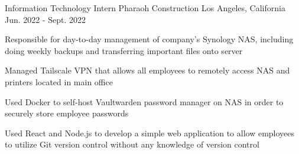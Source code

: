 \begin{cventries}
  \cventry
    {Information Technology Intern} %
    {Pharaoh Construction} %
    {Los Angeles, California} %
    {Jun. 2022 - Sept. 2022} %
    {
      \begin{cvitems} %
        \item{Responsible for day-to-day management of company’s Synology NAS, including doing weekly
              backups and transferring important files onto server}
        \item{Managed Tailscale VPN that allows all employees to remotely access NAS and printers located in
              main office}
        \item{Used Docker to self-host Vaultwarden password manager on NAS in order to securely store
              employee passwords}
        \item{Used React and Node.js to develop a simple web application to allow employees to utilize Git
              version control without any knowledge of version control}
      \end{cvitems}
  }
\end{cventries}
